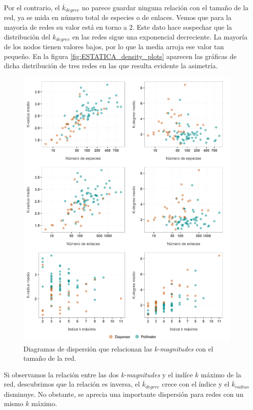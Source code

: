 Por el contrario, el $\overline{k}_{degree}$ no parece guardar ninguna relación con el tamaño de la red, ya se mida en número total de especies o de enlaces. Vemos que para la mayoría de redes su valor está en torno a $2$. Este dato hace sospechar que la distribución del ${k}_{degree}$ en las redes sigue una exponencial decreciente. La mayoría de los nodos tienen valores bajos, por lo que la media arroja ese valor tan pequeño. En la figura \ref{fig:ESTATICA_density_plots} aparecen las gráficas de dicha distribución de tres redes en las que resulta evidente la asimetría. 

\begin{figure}[h!]
\centering
\includegraphics[scale=0.18]{Figures/ESTATICA_tamanyo_kdegree_kradius.png}
\caption{Diagramas de dispersión que relacionan las \textit{k-magnitudes} con el tamaño de la red.}
\label{fig:ESTATICA_tamanyo_kdegree_kradius}
\end{figure}

Si observamos la relación entre las dos \textit{k-magnitudes} y el indíce $k$ máximo de la red, descubrimos que la relación es inversa, el $\overline{k}_{degree}$ crece con el índice y el $\overline{k}_{radius}$ disminuye. No obstante, se aprecia una importante dispersión para redes con un mismo $k$ máximo.


